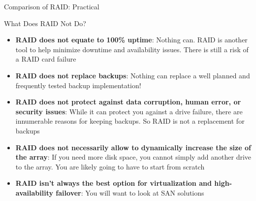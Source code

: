 \documentclass[aspectratio=169, xcolor=dvipsnames]{beamer}
\begin{document}
\begin{frame}{Comparison of RAID: Practical}
    \begin{table}[H]
        \centering
    \end{table}
\end{frame}

\begin{frame}{What Does RAID Not Do?}
    \begin{itemize}[<+->]
        \item \textbf{RAID does not equate to 100\% uptime}: Nothing can. RAID is another tool to help minimize downtime and availability issues. There is still a risk of a RAID card failure
        \item \textbf{RAID does not replace backups}: Nothing can replace a well planned and frequently tested backup implementation!
        \item \textbf{RAID does not protect against data corruption, human error, or security issues}: While it can protect you against a drive failure, there are innumerable reasons for keeping backups. So RAID is not a replacement for backups
        \item \textbf{RAID does not necessarily allow to dynamically increase the size of the array}: If you need more disk space, you cannot simply add another drive to the array. You are likely going to have to start from scratch
        \item \textbf{RAID isn't always the best option for virtualization and high-availability failover}: You will want to look at SAN solutions
    \end{itemize}
\end{frame}
\end{document}
